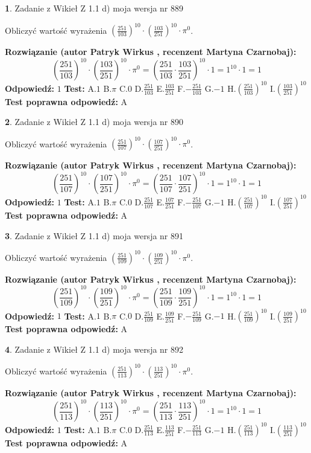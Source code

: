 \documentclass[12pt, a4paper]{article}
\theoremstyle{definition} %
\newtheorem{zad}{}
\newcommand{\zadStart}[1]{\begin{zad}#1\newline}
\newcommand{\zadStop}{\end{zad}}
\newcommand{\rozwStart}[2]{\noindent \textbf{Rozwiązanie (autor #1 , recenzent #2): }\newline}
\newcommand{\rozwStop}{\newline}
\newcommand{\odpStart}{\noindent \textbf{Odpowiedź:}\newline}
\newcommand{\odpStop}{\newline}
\newcommand{\testStart}{\noindent \textbf{Test:}\newline}
\newcommand{\testStop}{\newline}
\newcommand{\kluczStart}{\noindent \textbf{Test poprawna odpowiedź:}\newline}
\newcommand{\kluczStop}{\newline}
\begin{document}
\zadStart{Zadanie z Wikieł Z 1.1 d) moja wersja nr 889}

Obliczyć wartość wyrażenia $(\frac{251}{103})^{10} \cdot (\frac{103}{251})^{10} \cdot \pi^{0}$.
\zadStop
\rozwStart{Patryk Wirkus}{Martyna Czarnobaj}
$$(\frac{251}{103})^{10} \cdot (\frac{103}{251})^{10} \cdot \pi^{0} = (\frac{251}{103} \cdot \frac{103}{251})^{10} \cdot 1 = 1^{10} \cdot 1 = 1$$
\rozwStop
\odpStart
$1$
\odpStop
\testStart
A.$1$ B.$\pi$ C.$0$ D.$\frac{251}{103}$ E.$\frac{103}{251}$
F.$-\frac{251}{103}$ G.$-1$
H.$(\frac{251}{103})^{10}$
I.$(\frac{103}{251})^{10}$
\testStop
\kluczStart
A
\kluczStop



\zadStart{Zadanie z Wikieł Z 1.1 d) moja wersja nr 890}

Obliczyć wartość wyrażenia $(\frac{251}{107})^{10} \cdot (\frac{107}{251})^{10} \cdot \pi^{0}$.
\zadStop
\rozwStart{Patryk Wirkus}{Martyna Czarnobaj}
$$(\frac{251}{107})^{10} \cdot (\frac{107}{251})^{10} \cdot \pi^{0} = (\frac{251}{107} \cdot \frac{107}{251})^{10} \cdot 1 = 1^{10} \cdot 1 = 1$$
\rozwStop
\odpStart
$1$
\odpStop
\testStart
A.$1$ B.$\pi$ C.$0$ D.$\frac{251}{107}$ E.$\frac{107}{251}$
F.$-\frac{251}{107}$ G.$-1$
H.$(\frac{251}{107})^{10}$
I.$(\frac{107}{251})^{10}$
\testStop
\kluczStart
A
\kluczStop



\zadStart{Zadanie z Wikieł Z 1.1 d) moja wersja nr 891}

Obliczyć wartość wyrażenia $(\frac{251}{109})^{10} \cdot (\frac{109}{251})^{10} \cdot \pi^{0}$.
\zadStop
\rozwStart{Patryk Wirkus}{Martyna Czarnobaj}
$$(\frac{251}{109})^{10} \cdot (\frac{109}{251})^{10} \cdot \pi^{0} = (\frac{251}{109} \cdot \frac{109}{251})^{10} \cdot 1 = 1^{10} \cdot 1 = 1$$
\rozwStop
\odpStart
$1$
\odpStop
\testStart
A.$1$ B.$\pi$ C.$0$ D.$\frac{251}{109}$ E.$\frac{109}{251}$
F.$-\frac{251}{109}$ G.$-1$
H.$(\frac{251}{109})^{10}$
I.$(\frac{109}{251})^{10}$
\testStop
\kluczStart
A
\kluczStop



\zadStart{Zadanie z Wikieł Z 1.1 d) moja wersja nr 892}

Obliczyć wartość wyrażenia $(\frac{251}{113})^{10} \cdot (\frac{113}{251})^{10} \cdot \pi^{0}$.
\zadStop
\rozwStart{Patryk Wirkus}{Martyna Czarnobaj}
$$(\frac{251}{113})^{10} \cdot (\frac{113}{251})^{10} \cdot \pi^{0} = (\frac{251}{113} \cdot \frac{113}{251})^{10} \cdot 1 = 1^{10} \cdot 1 = 1$$
\rozwStop
\odpStart
$1$
\odpStop
\testStart
A.$1$ B.$\pi$ C.$0$ D.$\frac{251}{113}$ E.$\frac{113}{251}$
F.$-\frac{251}{113}$ G.$-1$
H.$(\frac{251}{113})^{10}$
I.$(\frac{113}{251})^{10}$
\testStop
\kluczStart
A
\kluczStop
\end{document}
